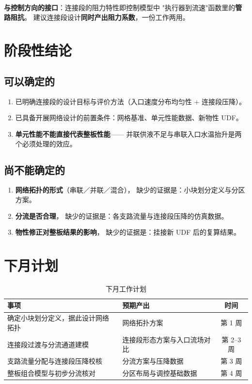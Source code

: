 \documentclass[stage2,fontset=fandol]{ydzjreport}
\begin{document}
\begin{keybox}
\textbf{与控制方向的接口}：连接段的阻力特性即控制模型中
"执行器到流速"函数里的\textbf{管路阻抗}。
建议连接段设计\textbf{同时产出阻力系数}，一份工作两用。
\end{keybox}

\section{阶段性结论}

\subsection{可以确定的}

\begin{enumerate}
  \item 已明确连接段的设计目标与评价方法（入口速度分布均匀性 + 连接段压降）。
  \item 已具备开展网络设计的前置条件：网格基准、单元性能数据、新物性 UDF。
  \item \textbf{单元性能不能直接代表整板性能}——
        并联供液不足与串联入口水温抬升是两个必须处理的效应。
\end{enumerate}

\subsection{尚不能确定的}

\begin{enumerate}
  \item \textbf{网络拓扑的形式}（串联／并联／混合），
        缺少的证据是：小块划分定义与分区方案。
  \item \textbf{分流是否合理}，
        缺少的证据是：各支路流量与连接段压降的仿真数据。
  \item \textbf{物性修正对整板结果的影响}，
        缺少的证据是：挂接新 UDF 后的复算结果。
\end{enumerate}

\section{下月计划}

\begin{table}[H]
\centering
\caption{下月工作计划}
\label{tab:plan}
\begin{tabularx}{\textwidth}{@{}Y Y c@{}}
\toprule
{} 事项 & 预期产出 & 时间 \\
\midrule
确定小块划分定义，据此设计网络拓扑 & 网络拓扑方案 & 第 1 周 \\
连接段过渡与分流通道建模 & 连接段形态方案与入口流场对比 & 第 2--3 周 \\
支路流量分配与连接段压降校核 & 分流方案与压降数据 & 第 3 周 \\
整板组合模型与初步分流核对 & 分区布局与调控基础数据 & 第 4 周 \\
\bottomrule
\end{tabularx}
\end{table}
\end{document}
